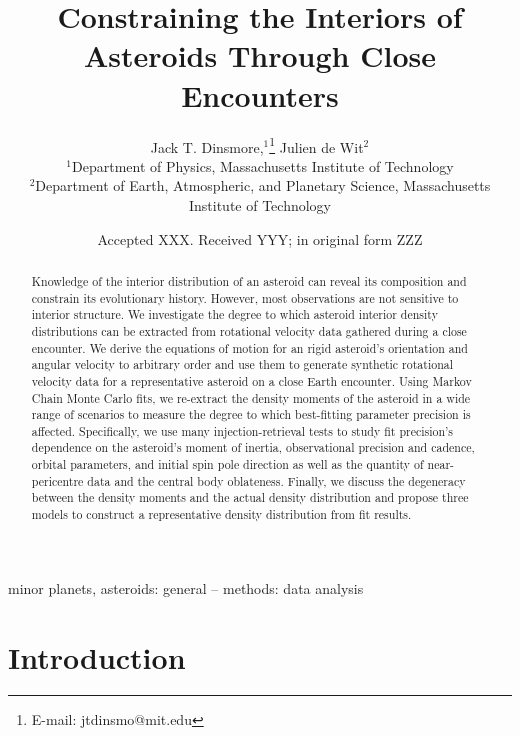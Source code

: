 \documentclass[fleqn,usenatbib]{mnras}
\title[Flyby Constraints on Asteroids Interiors]{Constraining the Interiors of Asteroids Through Close Encounters}
\author[Jack T. Dinsmore, Julien de Wit]{
Jack T. Dinsmore,$^{1}$\thanks{E-mail: jtdinsmo@mit.edu}
Julien de Wit$^{2}$
\\
$^{1}$Department of Physics, Massachusetts Institute of Technology\\
$^{2}$Department of Earth, Atmospheric, and Planetary Science, Massachusetts Institute of Technology
}
\date{Accepted XXX. Received YYY; in original form ZZZ}
\begin{document}
\label{firstpage}
\pagerange{\pageref{firstpage}--\pageref{lastpage}}
\maketitle

\begin{abstract}
  Knowledge of the interior distribution of an asteroid can reveal its composition and constrain its evolutionary history. However, most observations are not sensitive to interior structure. We investigate the degree to which asteroid interior density distributions can be extracted from rotational velocity data gathered during a close encounter. We derive the equations of motion for an rigid asteroid's orientation and angular velocity to arbitrary order and use them to generate synthetic rotational velocity data for a representative asteroid on a close Earth encounter. Using Markov Chain Monte Carlo fits, we re-extract the density moments of the asteroid in a wide range of scenarios to measure the degree to which best-fitting parameter precision is affected. Specifically, we use many injection-retrieval tests to study fit precision's dependence on the asteroid's moment of inertia, observational precision and cadence, orbital parameters, and initial spin pole direction as well as the quantity of near-pericentre data and the central body oblateness. Finally, we discuss the degeneracy between the density moments and the actual density distribution and propose three models to construct a representative density distribution from fit results.
\end{abstract}

\begin{keywords}
  minor planets, asteroids: general -- methods: data analysis
\end{keywords}



\section{Introduction}
\end{document}
